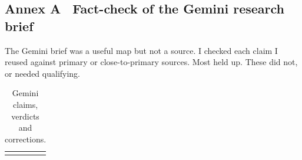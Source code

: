 \newpage
{}

\subsection*{Annex A \textbullet\ Fact-check of the Gemini research brief}

The Gemini brief \cite{gemini2026} was a useful map but not a source. I checked each claim I reused against primary or close-to-primary sources. Most held up. These did not, or needed qualifying.

{\tablefont
\begin{xltabular}{\textwidth}{@{}L >{\RaggedRight\arraybackslash}p{19mm} L@{}}
\caption{Gemini claims, verdicts and corrections.}\\

\toprule
{} &  & \\ \midrule
\endfirsthead
\toprule{} &  & \\ \midrule
\endhead


\end{xltabular}}

